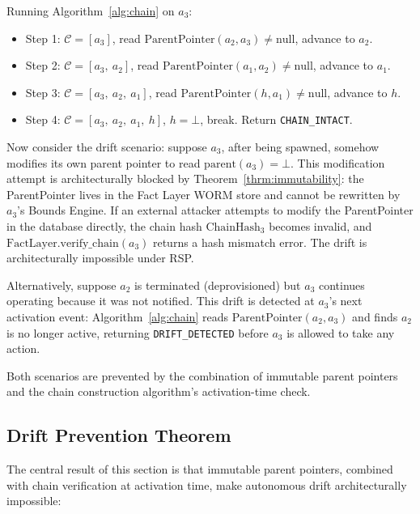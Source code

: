 Running Algorithm~\ref{alg:chain} on $a_3$:
\begin{itemize}
  \item Step 1: $\mathcal{C} = [a_3]$, read $\mathrm{ParentPointer}(a_2, a_3) \neq \text{null}$, advance to $a_2$.
  \item Step 2: $\mathcal{C} = [a_3,\ a_2]$, read $\mathrm{ParentPointer}(a_1, a_2) \neq \text{null}$, advance to $a_1$.
  \item Step 3: $\mathcal{C} = [a_3,\ a_2,\ a_1]$, read $\mathrm{ParentPointer}(h, a_1) \neq \text{null}$, advance to $h$.
  \item Step 4: $\mathcal{C} = [a_3,\ a_2,\ a_1,\ h]$, $h = \bot$, break. Return \texttt{CHAIN\_INTACT}.
\end{itemize}

Now consider the drift scenario: suppose $a_3$, after being spawned, somehow modifies its own parent pointer to read $\mathrm{parent}(a_3) = \bot$. This modification attempt is architecturally blocked by Theorem~\ref{thrm:immutability}: the ParentPointer lives in the Fact Layer WORM store and cannot be rewritten by $a_3$'s Bounds Engine. If an external attacker attempts to modify the ParentPointer in the database directly, the chain hash $\mathrm{ChainHash}_3$ becomes invalid, and $\mathrm{FactLayer.verify\_chain}(a_3)$ returns a hash mismatch error. The drift is architecturally impossible under RSP.

Alternatively, suppose $a_2$ is terminated (deprovisioned) but $a_3$ continues operating because it was not notified. This drift is detected at $a_3$'s next activation event: Algorithm~\ref{alg:chain} reads $\mathrm{ParentPointer}(a_2, a_3)$ and finds $a_2$ is no longer active, returning \texttt{DRIFT\_DETECTED} before $a_3$ is allowed to take any action.

Both scenarios are prevented by the combination of immutable parent pointers and the chain construction algorithm's activation-time check.

\subsection{Drift Prevention Theorem}

The central result of this section is that immutable parent pointers, combined with chain verification at activation time, make autonomous drift architecturally impossible:

